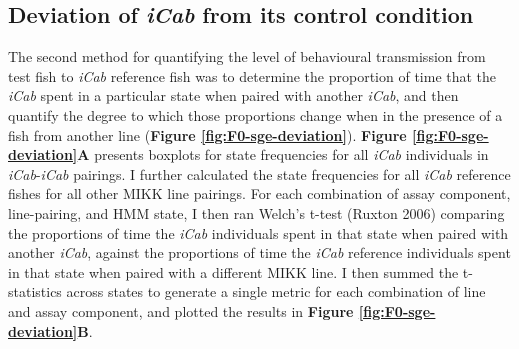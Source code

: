 \documentclass[
]{book}
\begin{document}
\hypertarget{deviation-of-from-its-control-condition}{%
\subsection{\texorpdfstring{Deviation of \emph{\textcolor{iCab_424B4D}{iCab}} from its control condition}{Deviation of  from its control condition}}\label{deviation-of-from-its-control-condition}}

The second method for quantifying the level of behavioural transmission from test fish to \emph{\textcolor{iCab_424B4D}{iCab}} reference fish was to determine the proportion of time that the \emph{\textcolor{iCab_424B4D}{iCab}} spent in a particular state when paired with another \emph{\textcolor{iCab_424B4D}{iCab}}, and then quantify the degree to which those proportions change when in the presence of a fish from another line (\textbf{Figure \ref{fig:F0-sge-deviation}}). \textbf{Figure \ref{fig:F0-sge-deviation}A} presents boxplots for state frequencies for all \emph{\textcolor{iCab_424B4D}{iCab}} individuals in \emph{\textcolor{iCab_424B4D}{iCab}}-\emph{\textcolor{iCab_424B4D}{iCab}} pairings. I further calculated the state frequencies for all \emph{\textcolor{iCab_424B4D}{iCab}} reference fishes for all other MIKK line pairings. For each combination of assay component, line-pairing, and HMM state, I then ran Welch's t-test (Ruxton 2006) comparing the proportions of time the \emph{\textcolor{iCab_424B4D}{iCab}} individuals spent in that state when paired with another \emph{\textcolor{iCab_424B4D}{iCab}}, against the proportions of time the \emph{\textcolor{iCab_424B4D}{iCab}} reference individuals spent in that state when paired with a different MIKK line. I then summed the t-statistics across states to generate a single metric for each combination of line and assay component, and plotted the results in \textbf{Figure \ref{fig:F0-sge-deviation}B}.
\end{document}
